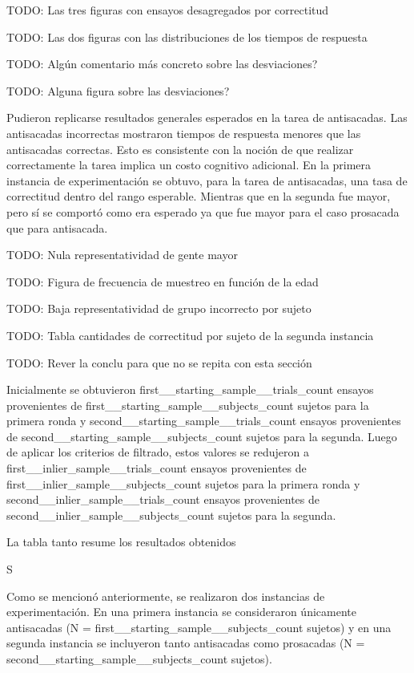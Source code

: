 TODO: Las tres figuras con ensayos desagregados por correctitud

TODO: Las dos figuras con las distribuciones de los tiempos de respuesta


TODO: Algún comentario más concreto sobre las desviaciones?

TODO: Alguna figura sobre las desviaciones?


Pudieron replicarse resultados generales esperados en la tarea de antisacadas.
Las antisacadas incorrectas mostraron tiempos de respuesta menores que las
antisacadas correctas.
Esto es consistente con la noción de que realizar correctamente la tarea
implica un costo cognitivo adicional.
En la primera instancia de experimentación se obtuvo, para la tarea de
antisacadas, una tasa de correctitud dentro del rango esperable.
Mientras que en la segunda fue mayor, pero sí se comportó como era esperado ya
que fue mayor para el caso prosacada que para antisacada.

TODO: Nula representatividad de gente mayor

TODO: Figura de frecuencia de muestreo en función de la edad


TODO: Baja representatividad de grupo incorrecto por sujeto

TODO: Tabla cantidades de correctitud por sujeto de la segunda instancia

%

TODO: Rever la conclu para que no se repita con esta sección


Inicialmente se obtuvieron {first__starting_sample__trials_count} ensayos
provenientes de {first__starting_sample__subjects_count} sujetos para la
primera ronda y {second__starting_sample__trials_count} ensayos provenientes de
{second__starting_sample__subjects_count} sujetos para la segunda.
Luego de aplicar los criterios de filtrado, estos valores se redujeron a
{first__inlier_sample__trials_count} ensayos provenientes de
{first__inlier_sample__subjects_count} sujetos para la primera ronda y
{second__inlier_sample__trials_count} ensayos provenientes de
{second__inlier_sample__subjects_count} sujetos para la segunda.


La tabla tanto resume los resultados obtenidos

S

Como se mencionó anteriormente, se realizaron dos instancias de experimentación.
En una primera instancia se consideraron únicamente antisacadas (N =
{first__starting_sample__subjects_count} sujetos) y en una segunda
instancia se incluyeron tanto antisacadas como prosacadas (N =
{second__starting_sample__subjects_count} sujetos).

